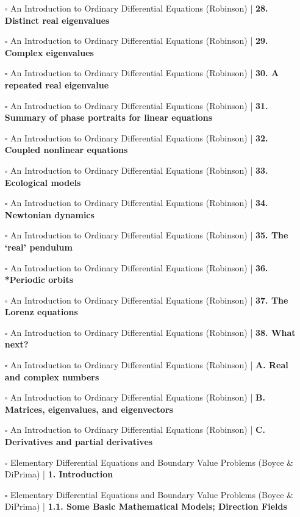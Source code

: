 \documentclass[a4, landscape, 12pt]{article}
\newcommand{\checkbox}{$\square$}%
\begin{document}
\begin{itemize}
{}
\item [\checkbox] An Introduction to Ordinary Differential Equations (Robinson)  | \textbf{28. Distinct real eigenvalues
}
\item [\checkbox] An Introduction to Ordinary Differential Equations (Robinson)  | \textbf{29. Complex eigenvalues
}
\item [\checkbox] An Introduction to Ordinary Differential Equations (Robinson)  | \textbf{30. A repeated real eigenvalue
}
\item [\checkbox] An Introduction to Ordinary Differential Equations (Robinson)  | \textbf{31. Summary of phase portraits for linear equations
}
\item [\checkbox] An Introduction to Ordinary Differential Equations (Robinson)  | \textbf{32. Coupled nonlinear equations
}
\item [\checkbox] An Introduction to Ordinary Differential Equations (Robinson)  | \textbf{33. Ecological models
}
\item [\checkbox] An Introduction to Ordinary Differential Equations (Robinson)  | \textbf{34. Newtonian dynamics
}
\item [\checkbox] An Introduction to Ordinary Differential Equations (Robinson)  | \textbf{35. The ‘real’ pendulum
}
\item [\checkbox] An Introduction to Ordinary Differential Equations (Robinson)  | \textbf{36. *Periodic orbits
}
\item [\checkbox] An Introduction to Ordinary Differential Equations (Robinson)  | \textbf{37. The Lorenz equations
}
\item [\checkbox] An Introduction to Ordinary Differential Equations (Robinson)  | \textbf{38. What next?
}
\item [\checkbox] An Introduction to Ordinary Differential Equations (Robinson)  | \textbf{A. Real and complex numbers
}
\item [\checkbox] An Introduction to Ordinary Differential Equations (Robinson)  | \textbf{B. Matrices, eigenvalues, and eigenvectors
}
\item [\checkbox] An Introduction to Ordinary Differential Equations (Robinson)  | \textbf{C. Derivatives and partial derivatives
}
\item [\checkbox] Elementary Differential Equations and Boundary Value Problems (Boyce & DiPrima)  | \textbf{1. Introduction
}
\item [\checkbox] Elementary Differential Equations and Boundary Value Problems (Boyce & DiPrima)  | \textbf{1.1. Some Basic Mathematical Models; Direction Fields
}
\end{itemize}
\end{document}
